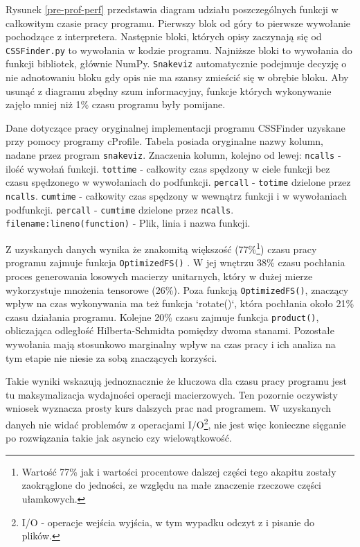 \documentclass[10pt, a4paper]{article}
\newcommand{\code}[1]{\texttt{#1}}
\begin{document}
\begin{sloppypar}
    Rysunek \ref{pre-prof-perf} przedstawia diagram udziału poszczególnych funkcji w
    całkowitym czasie pracy programu. Pierwszy blok od góry to pierwsze wywołanie pochodzące
    z interpretera. Następnie bloki, których opisy zaczynają się od \code{CSSFinder.py}
    to wywołania w kodzie programu. Najniższe bloki to wywołania do funkcji bibliotek,
    głównie NumPy. \code{Snakeviz} automatycznie podejmuje decyzję o nie adnotowaniu
    bloku gdy opis nie ma szansy zmieścić się w obrębie bloku. Aby usunąć z diagramu zbędny
    szum informacyjny, funkcje których wykonywanie zajęło mniej niż 1\% czasu programu były
    pomijane.

    \FloatBarrier
    \begin{table}[ht]
      \tiny
      \centering
      
      \caption{{} Dane dotyczące pracy oryginalnej implementacji programu CSSFinder uzyskane przy pomocy programy cProfile. Tabela posiada oryginalne nazwy kolumn, nadane przez program \code{snakeviz}. Znaczenia kolumn, kolejno od lewej: \code{ncalls} - ilość wywołań funkcji. \code{tottime} - całkowity czas spędzony w ciele funkcji bez czasu spędzonego w wywołaniach do podfunkcji. \code{percall} - \code{totime} dzielone przez \code{ncalls}. \code{cumtime} - całkowity czas spędzony w wewnątrz funkcji i w wywołaniach podfunkcji. \code{percall} - \code{cumtime} dzielone przez \code{ncalls}. \code{filename:lineno(function)} - Plik, linia i nazwa funkcji.}
    \end{table}
    \FloatBarrier

    Z uzyskanych danych wynika że znakomitą większość (77\%\footnote{Wartość 77\% jak i
    wartości procentowe dalszej części tego akapitu zostały zaokrąglone do jedności, ze względu
    na małe znaczenie rzeczowe części ułamkowych.}) czasu pracy programu zajmuje funkcja
    \code{OptimizedFS()} . W jej wnętrzu 38\% czasu pochłania proces generowania
    losowych macierzy unitarnych, który w dużej mierze wykorzystuje mnożenia tensorowe (26\%).
    Poza funkcją \code{OptimizedFS()}, znaczący wpływ na czas wykonywania ma też funkcja
    `rotate()`, która pochłania około 21\% czasu działania programu. Kolejne 20\% czasu zajmuje
    funkcja \code{product()}, obliczająca odległość Hilberta-Schmidta pomiędzy dwoma stanami.
    Pozostałe wywołania mają stosunkowo marginalny wpływ na czas pracy i ich analiza na
    tym etapie nie niesie za sobą znaczących korzyści.

    Takie wyniki wskazują jednoznacznie że kluczowa dla czasu pracy programu jest tu
    maksymalizacja wydajności operacji macierzowych. Ten pozornie oczywisty wniosek wyznacza
    prosty kurs dalszych prac nad programem. W uzyskanych danych nie widać problemów z
    operacjami I/O\footnote{I/O - operacje wejścia wyjścia, w tym wypadku odczyt z i
    pisanie do plików.}, nie jest więc konieczne sięganie po rozwiązania takie jak asyncio
    czy wielowątkowość.


\end{sloppypar}
\end{document}
